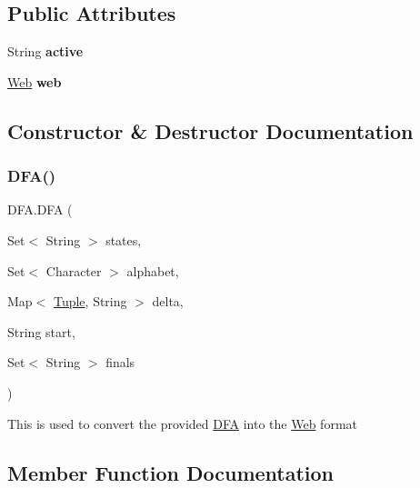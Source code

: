 \subsection*{Public Attributes}
\begin{DoxyCompactItemize}
\item 
\mbox{\label{class_d_f_a_a0a0a65bb0d4d4c7ee3af3865cfaac445}} 
String {\bfseries active}
\item 
\mbox{\label{class_d_f_a_a7c8e7a553ba9c7e2da5df854acaadace}} 
\mbox{\hyperlink{class_web}{Web}} {\bfseries web}
\end{DoxyCompactItemize}


\subsection{Constructor \& Destructor Documentation}
\mbox{\label{class_d_f_a_a2dac22724db342b9f981318325f99f0e}} 
\subsubsection{\texorpdfstring{DFA()}{DFA()}}
{\footnotesize\ttfamily D\+F\+A.\+D\+FA (\begin{DoxyParamCaption}\item[{Set$<$ String $>$}]{states,  }\item[{Set$<$ Character $>$}]{alphabet,  }\item[{Map$<$ \mbox{\hyperlink{class_tuple}{Tuple}}, String $>$}]{delta,  }\item[{String}]{start,  }\item[{Set$<$ String $>$}]{finals }\end{DoxyParamCaption})\hspace{0.3cm}{\ttfamily [inline]}}

This is used to convert the provided \mbox{\hyperlink{class_d_f_a}{D\+FA}} into the \mbox{\hyperlink{class_web}{Web}} format

\subsection{Member Function Documentation}
\mbox{\label{class_d_f_a_a77e6a5e4aa6f18671a8e4534735ede72}} 
